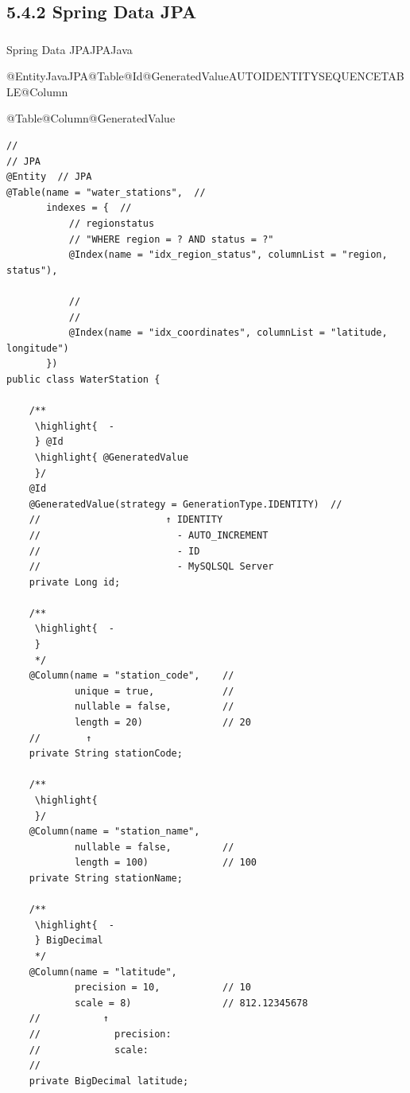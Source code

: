 \hypertarget{spring-data-jpa}{%
\subsection{5.4.2 Spring Data JPA}\label{spring-data-jpa}}

\hypertarget{section-60}{%
\subsubsection{}\label{section-60}}

Spring Data JPAJPAJava

\important{}@EntityJavaJPA@Table@Id@GeneratedValueAUTOIDENTITYSEQUENCETABLE@Column

@Table@Column@GeneratedValue

\begin{lstlisting}[style=java]
// 
// JPA
@Entity  // JPA
@Table(name = "water_stations",  // 
       indexes = {  // 
           // regionstatus
           // "WHERE region = ? AND status = ?"
           @Index(name = "idx_region_status", columnList = "region, status"),
           
           // 
           // 
           @Index(name = "idx_coordinates", columnList = "latitude, longitude")
       })
public class WaterStation {
    
    /**
     \highlight{  - 
     } @Id
     \highlight{ @GeneratedValue
     }/
    @Id
    @GeneratedValue(strategy = GenerationType.IDENTITY)  // 
    //                      ↑ IDENTITY
    //                        - AUTO_INCREMENT
    //                        - ID
    //                        - MySQLSQL Server
    private Long id;
    
    /**
     \highlight{  - 
     } 
     */
    @Column(name = "station_code",    // 
            unique = true,            // 
            nullable = false,         // 
            length = 20)              // 20
    //        ↑
    private String stationCode;
    
    /**
     \highlight{ 
     }/
    @Column(name = "station_name", 
            nullable = false,         // 
            length = 100)             // 100
    private String stationName;
    
    /**
     \highlight{  - 
     } BigDecimal
     */
    @Column(name = "latitude", 
            precision = 10,           // 10
            scale = 8)                // 812.12345678
    //           ↑
    //             precision: 
    //             scale: 
    //             
    private BigDecimal latitude;
    

\end{lstlisting}
